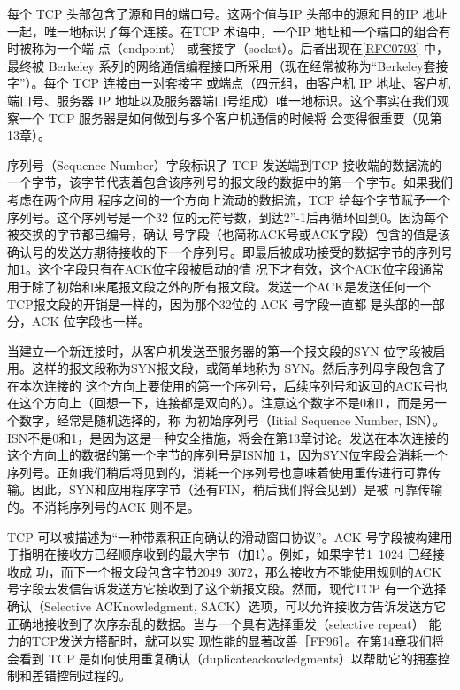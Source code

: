 每个 TCP 头部包含了源和目的端口号。这两个值与IP 头部中的源和目的IP 地址一起，唯一地标识了每个连接。在TCP 术语中，一个IP 地址和一个端口的组合有时被称为一个端
点（endpoint） 或套接字（socket）。后者出现在\href{https://www.rfc-editor.org/rfc/rfc0793}{[RFC0793]} 中，最终被 Berkeley 系列的网络通信编程接口所采用（现在经常被称为“Berkeley套接字”）。每个 TCP 连接由一对套接字
或端点（四元组，由客户机 IP 地址、客户机端口号、服务器 IP 地址以及服务器端口号组成）唯一地标识。这个事实在我们观察一个 TCP 服务器是如何做到与多个客户机通信的时候将
会变得很重要（见第13章）。

序列号（Sequence Number）字段标识了 TCP 发送端到TCP 接收端的数据流的一个字节，该字节代表着包含该序列号的报文段的数据中的第一个字节。如果我们考虑在两个应用
程序之间的一个方向上流动的数据流，TCP 给每个字节赋予一个序列号。这个序列号是一个32 位的无符号数，到达2”-1后再循环回到0。因沩每个被交换的字节都已编号，确认
号字段（也简称ACK号或ACK字段）包含的值是该确认号的发送方期待接收的下一个序列号。即最后被成功接受的数据字节的序列号加1。这个字段只有在ACK位字段被启动的情
况下才有效，这个ACK位字段通常用于除了初始和来尾报文段之外的所有报文段。发送一个ACK是发送任何一个TCP报文段的开销是一样的，因为那个32位的 ACK 号字段一直都
是头部的一部分，ACK 位字段也一样。

当建立一个新连接时，从客户机发送至服务器的第一个报文段的SYN 位字段被启用。这样的报文段称为SYN报文段，或简单地称为 SYN。然后序列母字段包含了在本次连接的
这个方向上要使用的第一个序列号，后续序列号和返回的ACK号也在这个方向上（回想一下，连接都是双向的）。注意这个数字不是0和1，而是另一个数字，经常是随机选择的，称
为初始序列号（Iitial Sequence Number, ISN）。ISN不是0和1，是因为这是一种安全措施，将会在第13章讨论。发送在本次连接的这个方向上的数据的第一个字节的序列号是ISN加
1，因为SYN位字段会消耗一个序列号。正如我们稍后将见到的，消耗一个序列号也意味着使用重传进行可靠传输。因此，SYN和应用程序字节（还有FIN，稍后我们将会见到）是被
可靠传输的。不消耗序列号的ACK 则不是。

TCP 可以被描述为“一种带累积正向确认的滑动窗口协议”。ACK 号字段被构建用于指明在接收方已经顺序收到的最大字节（加1）。例如，如果字节1~1024 已经接收成
功，而下一个报文段包含字节2049~3072，那么接收方不能使用规则的ACK 号字段去发信告诉发送方它接收到了这个新报文段。然而，现代TCP 有一个选择确认（Selective
ACKnowledgment, SACK）选项，可以允许接收方告诉发送方它正确地接收到了次序杂乱的数据。当与一个具有选择重发（selective repeat） 能力的TCP发送方搭配时，就可以实
现性能的显著改善［FF96］。在第14章我们将会看到 TCP 是如何使用重复确认（duplicateackowledgments）以帮助它的拥塞控制和差错控制过程的。

